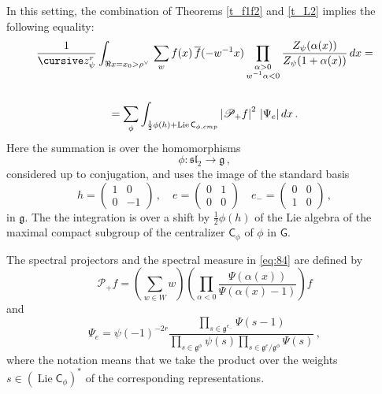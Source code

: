 \documentclass[14pt]{extarticle}
\newcommand{\cz}{\textup{\small \cursive z}}
\newcommand{\bG}{\mathsf{G}}
\newcommand{\bC}{\mathsf{C}}
\newcommand{\cP}{\mathscr{P}}
\newcommand{\fg}{\mathfrak{g}}
\newcommand{\comp}{\textup{cmp}}
\DeclareMathOperator{\Lie}{Lie}
\theoremstyle{definition}
\begin{document}
In this setting, the combination of
Theorems \ref{t_f1f2} and \ref{t_L2} implies the following equality: 
%
\begin{multline}
  \label{eq:84}
\frac{1}{\cz_\psi^r} \int_{\Re x = x_0 > \rho^\vee} 
  \, 
   \sum_w f(x) \, \overline{f}(-w^{-1} x) \prod_{\substack{\alpha > 0 \\ w^{-1} \alpha <0 }}
   \frac{Z_\psi(\alpha(x))}{Z_\psi(1+\alpha(x))}  \, dx =\\
   \\ =
   \sum_{\phi} \int_{\frac12 \phi(h) + \Lie \bC_{\phi,\comp}} \left|\cP_+ f
   \right|^2 \, |\Psi_e| \,dx \,. 
\end{multline}
%
Here the summation is over the homomorphisms
\[
  \phi : \mathfrak{sl}_2 \to \fg \,,
\]
considered up to conjugation, and uses the image of the standard basis
\[
  h =  \begin{pmatrix}
    1 & 0\\
    0 & - 1
  \end{pmatrix} \,, \quad
  e = \begin{pmatrix}
    0 &1\\
    0 & 0
  \end{pmatrix} \quad
  e_- = \begin{pmatrix}
    0 &0\\
    1 & 0
  \end{pmatrix}\,, 
  \]
  in $\fg$. The the integration is over a
shift by
$\tfrac 12 \phi(h)$ 
of the Lie algebra of the maximal compact subgroup of the centralizer
$\bC_\phi$ of $\phi$ in $\bG$.

The spectral projectors and the spectral measure in \eqref{eq:84} are
defined by
\[
  \cP_+ f = \left( \sum_{w\in W} w \right) \left(\prod_{\alpha<0}
  \frac{\Psi(\alpha(x))}{\Psi(\alpha(x)-1)} \right) f
\]
and
\[
  \Psi_e = \psi(-1)^{-2r} \frac{\prod_{s\in \fg^{e_-}} \Psi (s-1)}
{\prod_{s\in \fg^{\phi}} \psi (s) \prod_{s\in \fg^e/\fg^{\phi}} \Psi (s)} \,,
\]
where the notation means that we take the product over the
weights $s \in \left(\Lie \bC_\phi\right)^*$ of the corresponding
representations. 
\end{document}
